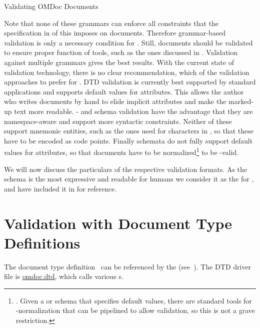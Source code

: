 \begin{module}[id=validating]
\begin{omgroup}[id=validating]{Validating OMDoc Documents}
\begin{omtext}
  Note that none of these grammars can enforce all constraints that the {\omdoc}
  specification in {} of this {\report} imposes on documents.
  Therefore grammar-based validation is only a necessary condition for
  . Still, {\omdoc} documents should be validated
  to ensure proper function of {\omdoc} tools, such as the ones discussed in
  {}.  Validation against multiple grammars gives the
  best results. With the current state of validation technology, there is no clear
  recommendation, which of the validation approaches to prefer for {\omdoc}. DTD
  validation is currently best supported by standard {\xml} applications and supports
  default values for attributes. This allows the author who writes {\omdoc} documents by
  hand to elide implicit attributes and make the marked-up text more readable.  {\xml}-
  and {\relaxng} schema validation have the advantage that they are namespace-aware and
  support more syntactic constraints.  Neither of these support mnemonic {\xml} entities,
  such as the ones used for {\unicode} characters in {\pmathml}, so that these have to be
  encoded as {\unicode} code points. Finally {\relaxng} schemata do not fully support
  default values for attributes, so that {\omdoc} documents have to be
  normalized\footnote{. Given a {} or {\xml} schema that
    specifies default values, there are standard {\xml} tools for {\xml}-normalization
    that can be pipelined to allow {\relaxng} validation, so this is not a grave
    restriction.} to be {\relaxng}-valid.
\end{omtext}

We will now discuss the particulars of the respective validation formats. As the
{\relaxng} schema is the most expressive and readable for humans we consider it as the
{} for {\omdoc}, and have included it in
{} for reference.

\section{Validation with Document Type Definitions}\label{sec:validate-dtd}  
  The {\omdoc} document type definition~\cite{OMDocDTD:URL} can be referenced by the
  {} {}
  (see~). The DTD driver file is \url{omdoc.dtd}, which calls various
  {s}.
  

\end{omgroup}
\end{module}
